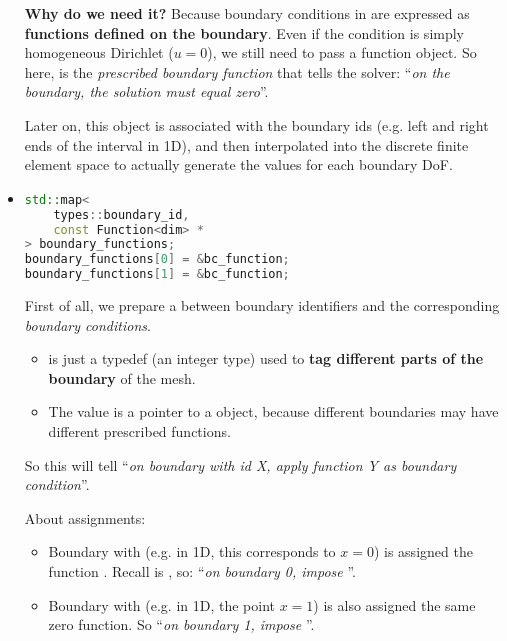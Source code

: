 \begin{itemize}
    \textcolor{Green3}{ \textbf{Why do we need it?}} Because boundary conditions in  are expressed as \textbf{functions defined on the boundary}. Even if the condition is simply homogeneous Dirichlet ($u=0$), we still need to pass a function object. So here,  is the \emph{prescribed boundary function} that tells the solver: ``\emph{on the boundary, the solution must equal zero}''.

    Later on, this object is associated with the boundary ids (e.g. left and right ends of the interval in 1D), and then interpolated into the discrete finite element space to actually generate the values for each boundary DoF.


    \item {}
    \begin{lstlisting}[language=C++]
std::map<
    types::boundary_id,
    const Function<dim> *
> boundary_functions;
boundary_functions[0] = &bc_function;
boundary_functions[1] = &bc_function;\end{lstlisting}
    First of all, we prepare a  between boundary identifiers and the corresponding \emph{boundary conditions}.
    \begin{itemize}
        \item {} is just a  typedef (an integer type) used to \textbf{tag different parts of the boundary} of the mesh.
        \item The value is a pointer to a  object, because different boundaries may have different prescribed functions.
    \end{itemize}
    So this  will tell  ``\emph{on boundary with id X, apply function Y as boundary condition}''.

    About assignments:
    \begin{itemize}
        \item {} Boundary with  (e.g. in 1D, this corresponds to $x=0$) is assigned the function . Recall  is , so: ``\emph{on boundary 0, impose }''.
        \item {} Boundary with  (e.g. in 1D, the point $x = 1$) is also assigned the same zero function. So ``\emph{on boundary 1, impose }''.
    \end{itemize}


\end{itemize}
